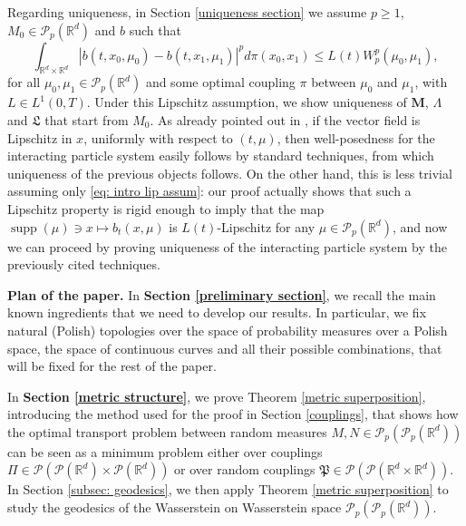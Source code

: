 \documentclass[10pt,leqno]{amsart}
\numberwithin{equation}{section}
\newcommand{\R}{\mathbb{R}}
\newcommand{\PP}{\mathcal{P}}
\begin{document}
Regarding uniqueness, in Section \ref{uniqueness section} we assume $p\geq 1$, $M_0\in \PP_p(\R^d)$ and $b$ such that
\begin{equation}\label{eq: intro lip assum}
    \int_{\R^d\times \R^d}|b(t,x_0,\mu_0) - b(t,x_1,\mu_1)|^p d\pi(x_0,x_1) \leq L(t)  W_p^p(\mu_0,\mu_1),
\end{equation}
for all $\mu_0,\mu_1 \in \PP_p(\R^d)$ and some optimal coupling $\pi$ between $\mu_0$ and $\mu_1$, with $L\in L^1(0,T)$. Under this Lipschitz assumption, we show uniqueness of $\boldsymbol{M}$, $\Lambda$ and $\mathfrak{L}$ that start from $M_0$. As already pointed out in \cite{carmona2018probabilistic,lacker2022superposition}, if the vector field is Lipschitz in $x$, uniformly with respect to $(t,\mu)$, then well-posedness for the interacting particle system easily follows by standard techniques, from which uniqueness of the previous objects follows. On the other hand, this is less trivial assuming only \eqref{eq: intro lip assum}: our proof actually shows that such a Lipschitz property is rigid enough to imply that the map $\operatorname{supp}(\mu)\ni x\mapsto b_t(x,\mu)$ is $L(t)$-Lipschitz for any $\mu\in \PP_p(\R^d)$, and now we can proceed by proving uniqueness of the interacting particle system by the previously cited techniques.





\textbf{Plan of the paper.}
In \textbf{Section \ref{preliminary section}}, we recall the main known ingredients that we need to develop our results. In particular, we fix natural (Polish) topologies over the space of probability measures over a Polish space, the space of continuous curves and all their possible combinations, that will be fixed for the rest of the paper.

In \textbf{Section \ref{metric structure}}, we prove Theorem \ref{metric superposition}, introducing the method used for the proof in Section \ref{couplings}, that shows how the optimal transport problem between random measures $M,N \in \PP_p(\PP_p(\R^d))$ can be seen as a minimum problem either over couplings $\Pi \in \PP(\PP(\R^d) \times \PP(\R^d))$ or over random couplings $\mathfrak{P}\in\PP(\PP(\R^d\times \R^d))$. In Section \ref{subsec: geodesics}, we then apply Theorem \ref{metric superposition} to study the geodesics of the Wasserstein on Wasserstein space $\PP_p(\PP_p(\R^d))$.
\end{document}
